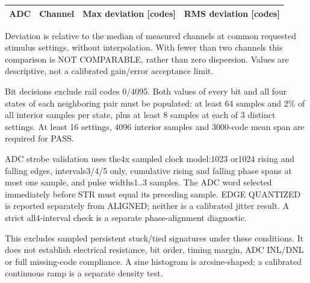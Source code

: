 \begin{longtable}{>{\raggedright\arraybackslash}p{.12\linewidth}>{\raggedright\arraybackslash}p{.15\linewidth}>{\raggedright\arraybackslash}p{.30\linewidth}>{\raggedright\arraybackslash}p{.30\linewidth}}
\toprule
ADC & Channel & Max deviation [codes] & RMS deviation [codes]\\\midrule
\endhead
\bottomrule
\end{longtable}
Deviation is relative to the median of measured channels at common requested stimulus settings, without interpolation. With fewer than two channels this comparison is NOT COMPARABLE, rather than zero dispersion. Values are descriptive, not a calibrated gain/error acceptance limit.

Bit decisions exclude rail codes 0/4095. Both values of every bit and all four states of each neighboring pair must be populated: at least 64 samples and 2\% of all interior samples per state, plus at least 8 samples at each of 3 distinct settings. At least 16 settings, 4096 interior samples and 3000-code mean span are required for PASS.

ADC strobe validation uses the4x sampled clock model:1023 or1024 rising and falling edges, intervals3/4/5 only, cumulative rising and falling phase spans at most one sample, and pulse widths1..3 samples. The ADC word selected immediately before STR must equal its preceding sample. EDGE QUANTIZED is reported separately from ALIGNED; neither is a calibrated jitter result. A strict all4-interval check is a separate phase-alignment diagnostic.

This excludes sampled persistent stuck/tied signatures under these conditions. It does not establish electrical resistance, bit order, timing margin, ADC INL/DNL or full missing-code compliance. A sine histogram is arcsine-shaped; a calibrated continuous ramp is a separate density test.

\clearpage
